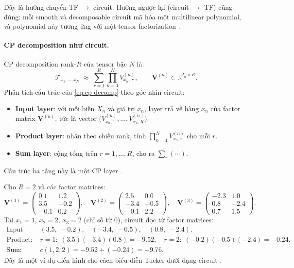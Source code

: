 Đây là hướng chuyển TF $\to$ circuit.  Hướng ngược lại (circuit $\to$ TF) cũng
đúng: mỗi smooth và decomposable circuit mã hóa một multilinear polynomial, và
polynomial này tương ứng với một tensor factorization \cite{loconte2025relationship}.

\paragraph{CP decomposition như circuit.}
CP decomposition rank-$R$ của tensor bậc $N$ là:
\begin{equation}
    \mathcal{T}_{x_1, \ldots, x_N}
    \;\approx\;
    \sum_{r=1}^{R} \prod_{n=1}^{N} V^{(n)}_{x_n,\, r},
    \qquad \mathbf{V}^{(n)} \in \mathbb{R}^{I_n \times R}.
    \label{eq:cp-decomp}
\end{equation}
Phân tích cấu trúc của \eqref{eq:cp-decomp} theo góc nhìn circuit:
\begin{itemize}[leftmargin=2em]
    \item \textbf{Input layer}: với mỗi biến $X_n$ và giá trị $x_n$, layer trả về
    hàng $x_n$ của factor matrix $\mathbf{V}^{(n)}$, tức là vector
    $\bigl(V^{(n)}_{x_n,1}, \ldots, V^{(n)}_{x_n,R}\bigr)$.
    \item \textbf{Product layer}: nhân theo chiều rank, tính
    $\prod_{n=1}^{N} V^{(n)}_{x_n,r}$ cho mỗi $r$.
    \item \textbf{Sum layer}: cộng tổng trên $r = 1, \ldots, R$, cho ra
    $\sum_r (\cdots)$.
\end{itemize}
Cấu trúc ba tầng này là một CP layer \cite{chrysos2025foundationsTutorial}.

\begin{example}
\label{ex:cp-eval}
Cho $R = 2$ và các factor matrices:
\[
\mathbf{V}^{(1)} = \begin{pmatrix} 0.1 & 1.2\\ 3.5 & -0.2\\ -0.1 & 0.2 \end{pmatrix},\quad
\mathbf{V}^{(2)} = \begin{pmatrix} 2.5 & 0.0\\ -3.4 & -0.5\\ -0.1 & 2.2 \end{pmatrix},\quad
\mathbf{V}^{(3)} = \begin{pmatrix} -2.3 & 1.0\\ 0.8 & -2.4\\ 0.7 & 1.5 \end{pmatrix}.
\]
Tại $x_1 = 1,\, x_2 = 2,\, x_3 = 2$ (chỉ số từ 0), circuit đọc từ factor matrices:
\begin{align*}
    \text{Input layer: } &
    (3.5,\,-0.2),\quad (-3.4,\,-0.5),\quad (0.8,\,-2.4). \\
    \text{Product: } &
    r=1:\; (3.5)(-3.4)(0.8) = -9.52, \quad
    r=2:\; (-0.2)(-0.5)(-2.4) = -0.24. \\
    \text{Sum: } &
    c(1,2,2) = -9.52 + (-0.24) = -9.76.
\end{align*}
Đây là một ví dụ điển hình cho cách biểu diễn Tucker dưới dạng circuit
\cite{chrysos2025foundationsTutorial}.
\end{example}

